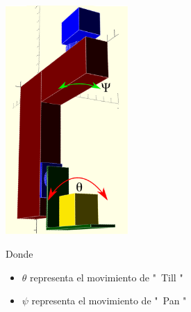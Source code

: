 \begin{center}
	\includegraphics[width=0.35\textwidth]{Contenido/Cuerpo/Capitulo5/Fig15.eps}
	\label{Fig1}
\end{center}
Donde 
\begin{itemize}
	\item $\theta$ representa el movimiento de "\ Till "
	\item $\psi$ representa el movimiento de "\ Pan  "
\end{itemize}

